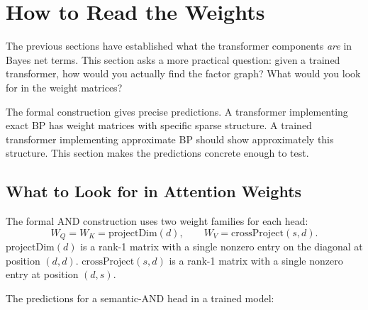 \section{How to Read the Weights}
\label{sec:how-to-read-weights}

The previous sections have established what the transformer components
\emph{are} in Bayes net terms. This section asks a more practical question:
given a trained transformer, how would you actually find the factor graph?
What would you look for in the weight matrices?

The formal construction gives precise predictions. A transformer implementing
exact BP has weight matrices with specific sparse structure. A trained
transformer implementing approximate BP should show approximately this
structure. This section makes the predictions concrete enough to test.

\subsection*{What to Look for in Attention Weights}

The formal AND construction uses two weight families for each head:
\[
W_Q = W_K = \mathrm{projectDim}(d), \qquad W_V = \mathrm{crossProject}(s, d).
\]
$\mathrm{projectDim}(d)$ is a rank-1 matrix with a single nonzero entry on
the diagonal at position $(d,d)$. $\mathrm{crossProject}(s,d)$ is a rank-1
matrix with a single nonzero entry at position $(d,s)$.

The predictions for a semantic-AND head in a trained model:

